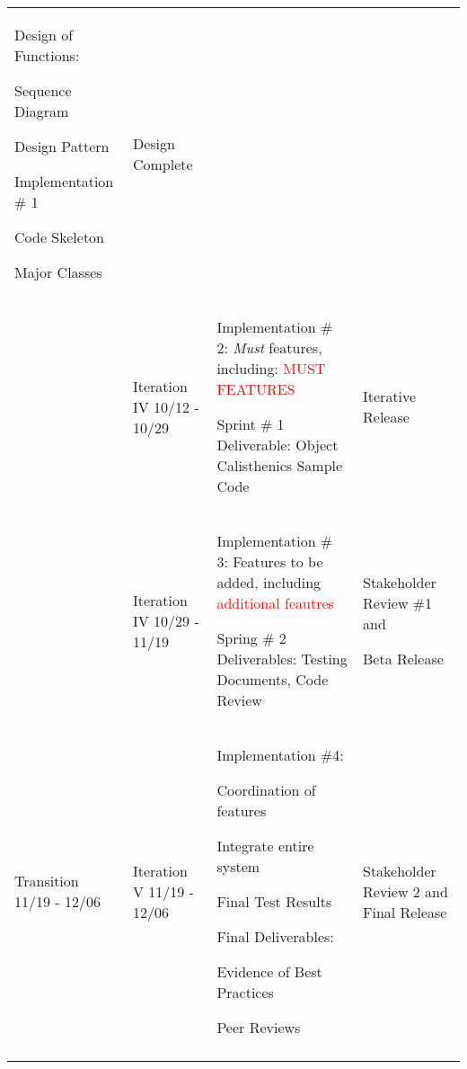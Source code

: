 \documentclass[11pt]{article}
\newenvironment{packed_itemize}{
\begin{itemize}
  \setlength{\itemsep}{1pt}
  \setlength{\parskip}{0pt}
  \setlength{\parsep}{0pt}
}{\end{itemize}}
\begin{document}
\begin{table}
\begin{tabular}{|p{0.9in}|p{0.9in}|p{3.2in}|p{.9in}|}
 Design of Functions:
	\begin{packed_itemize}
		\vspace{-0.15in}
		\item Sequence Diagram
		\item  Design Pattern
	\end{packed_itemize}

 Implementation \# 1
	\begin{packed_itemize}
		\vspace{-0.15in}
		\item Code Skeleton
		\item Major Classes
	\end{packed_itemize}
 & Design Complete \\  \cline{2-4}
&
 Iteration IV 10/12 - 10/29 &
 Implementation \# 2: \emph{Must} features, including: \textcolor{red}{MUST FEATURES}
 
Sprint \# 1 Deliverable: Object Calisthenics Sample Code
 & Iterative Release \\  \cline{2-4}
 &
 Iteration IV 10/29 - 11/19 &
 Implementation \# 3: Features to be added, including \textcolor{red}{additional feautres}

Spring \# 2 Deliverables: Testing Documents, Code Review &
 Stakeholder Review \#1 
and

Beta Release \\ \hline
Transition  11/19 - 12/06 &
Iteration V 11/19 - 12/06 &
Implementation \#4: 
	\begin{packed_itemize}
		\vspace{-0.15in}
		\item Coordination of features
		\item Integrate entire system
	\end{packed_itemize}
Final Test Results

Final Deliverables:
	\begin{packed_itemize}
	\vspace{-0.15in}
		\item Evidence of Best Practices
		\item Peer Reviews
	\end{packed_itemize}
	\vspace{-0.4in}
& 
Stakeholder Review 2 and Final Release
\\
&&& \\
\hline
\end{tabular}
\end{table}
\end{document}
